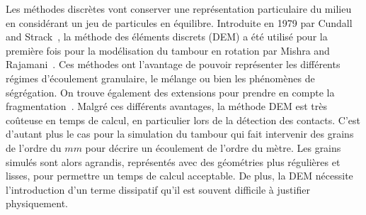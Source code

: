 Les méthodes discrètes vont conserver une représentation particulaire du milieu en considérant un jeu de particules en équilibre. Introduite en 1979 par Cundall and Strack~\cite{cundall_discrete_1979}, la méthode des éléments discrets (DEM) a été utilisé pour la première fois pour la modélisation du tambour en rotation par Mishra and Rajamani~\cite{Mishra1992}. Ces méthodes ont l'avantage de pouvoir représenter les différents régimes d'écoulement granulaire, le mélange ou bien les phénomènes de ségrégation. On trouve également des extensions pour prendre en compte la fragmentation~\cite{orozco:hal-02409236}. Malgré ces différents avantages, la méthode DEM est très coûteuse en temps de calcul, en particulier lors de la détection des contacts. C'est d'autant plus le cas pour la simulation du tambour qui fait intervenir des grains de l'ordre du $mm$ pour décrire un écoulement de l'ordre du mètre. Les grains simulés sont alors agrandis, représentés avec des géométries plus régulières et lisses, pour permettre un temps de calcul acceptable. De plus, la DEM nécessite l'introduction d'un terme dissipatif qu'il est souvent difficile à justifier physiquement.

